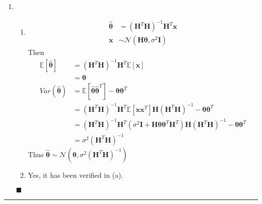 \documentclass[a4paper,12pt]{article}
\begin{document}
\begin{enumerate}
\begin{flushright}
            \end{flushright}
        \item
            \begin{enumerate}
                \item
                    \begin{align*}
                        \hat{\bm\theta}&=(\mathbf H^T\mathbf H)^{-1}\mathbf H^T\mathbf x\\
                        \mathbf x&\sim\mathcal N(\mathbf H\bm\theta,\sigma^2\mathbf I)
                    \end{align*}
                    Then
                    \begin{align*}
                        \mathbb E\left[\hat{\bm\theta}\right]&=(\mathbf H^T\mathbf H)^{-1}\mathbf H^T\mathbb E\left[\mathbf x\right]\\
                        &=\bm\theta\\
                        Var(\hat{\bm\theta}) &=\mathbb E\left[\hat{\bm\theta}\hat{\bm\theta}^T\right]-\bm\theta\bm\theta^T\\
                        &=(\mathbf H^T\mathbf H)^{-1}\mathbf H^T\mathbb E\left[\mathbf x\mathbf x^T\right]\mathbf H(\mathbf H^T\mathbf H)^{-1}-\bm\theta\bm\theta^T\\
                        &=(\mathbf H^T\mathbf H)^{-1}\mathbf H^T(\sigma^2\mathbf I+\mathbf H\bm\theta\bm\theta^T\mathbf H^T)\mathbf H(\mathbf H^T\mathbf H)^{-1}-\bm\theta\bm\theta^T\\
                        &=\sigma^2(\mathbf H^T\mathbf H)^{-1}
                    \end{align*}
                    Thus $\hat{\bm\theta}\sim\mathcal N(\bm\theta,\sigma^2(\mathbf H^T\mathbf H)^{-1})$
                    \item Yes, it has been verified in (a).
            \end{enumerate}
            \begin{flushright}
                $\blacksquare$
            \end{flushright}
    \end{enumerate}
    \rule{\textwidth}{0.4pt}
\end{document}
